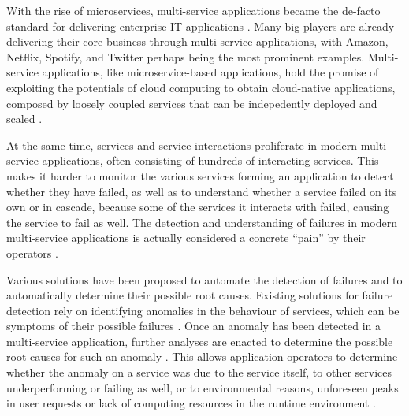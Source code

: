 With the rise of microservices, multi-service applications became the de-facto standard for delivering enterprise IT applications \cite{Soldani2018_MicroservicesPainsGains}.
Many big players are already delivering their core business through multi-service applications, with Amazon, Netflix, Spotify, and Twitter perhaps being the most prominent examples.
Multi-service applications, like microservice-based applications, hold the promise of exploiting the potentials of cloud computing to obtain cloud-native applications, \viz composed by loosely coupled services that can be indepedently deployed and scaled \cite{Kratzke2017_CloudNativeApplications}.

At the same time, services and service interactions proliferate in modern multi-service applications, often consisting of hundreds of interacting services.
This makes it harder to monitor the various services forming an application to detect whether they have failed, as well as to understand whether a service failed on its own or in cascade, \viz because some of the services it interacts with failed, causing the service to fail as well.
The detection and understanding of failures in modern multi-service applications is actually considered a concrete \enquote{pain} by their operators \cite{Soldani2018_MicroservicesPainsGains}.

Various solutions have been proposed to automate the detection of failures and to automatically determine their possible root causes.
Existing solutions for failure detection rely on identifying anomalies in the behaviour of services, which can be symptoms of their possible failures \cite{38_Nandi2016_AnomalyDetectionControlFlowGraphMining,34_Nedelkoski2019_AnomalyDetectionDistributedTracing,09_Wu2020_MicroserviceDiagnosisDeepLearning}.
Once an anomaly has been detected in a multi-service application, further analyses are enacted to determine the possible root causes for such an anomaly \cite{06_Lin2018_Microscope,49_Shan2019_epsilonDiagnosis}.
This allows application operators to determine whether the anomaly on a service was due to the service itself, to other services underperforming or failing as well, or to environmental reasons, \eg unforeseen peaks in user requests \cite{42_Nguyen2011_PAL} or lack of computing resources in the runtime environment \cite{40_Chen2020_CauseInfer}.

